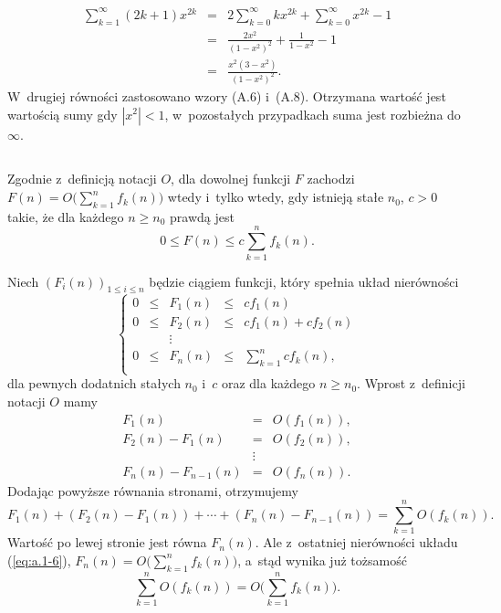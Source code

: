 \subsection{} %
\begin{eqnarray*}
	\sum_{k=1}^\infty(2k+1)x^{2k} &=& 2\sum_{k=0}^\infty kx^{2k}+\sum_{k=0}^\infty x^{2k}-1 \\
	&=& \frac{2x^2}{(1-x^2)^2}+\frac{1}{1-x^2}-1 \\
	&=& \frac{x^2(3-x^2)}{(1-x^2)^2}.
\end{eqnarray*}
W~drugiej równości zastosowano wzory (A.6) i~(A.8). Otrzymana wartość jest wartością sumy gdy $|x^2|<1$, w~pozostałych przypadkach suma jest rozbieżna do $\infty$.

\subsection{} %
Zgodnie z~definicją notacji $O$, dla dowolnej funkcji $F$ zachodzi $F(n) = O\bigl(\sum_{k=1}^nf_k(n)\bigr)$ wtedy i~tylko wtedy, gdy istnieją stałe $n_0$, $c>0$ takie, że dla każdego $n\ge n_0$ prawdą jest
\[
	0\le F(n)\le c\sum_{k=1}^n f_k(n).
\]

Niech $(F_i(n))_{1\le i\le n}$ będzie ciągiem funkcji, który spełnia układ nierówności
\begin{equation}
	\left\{\begin{array}{ccccl}
		0 & \le & F_1(n) &\le& cf_1(n) \\
		0 & \le & F_2(n) &\le& cf_1(n)+cf_2(n) \\
		& & \vdots \\
		0 & \le & F_n(n) &\le& \sum_{k=1}^ncf_k(n), \\
	\end{array}\right. \label{eq:a.1-6}
\end{equation}
dla pewnych dodatnich stałych $n_0$ i~$c$ oraz dla każdego $n\ge n_0$. Wprost z~definicji notacji $O$ mamy
\begin{eqnarray*}
	F_1(n) & = & O(f_1(n)),\\
	F_2(n)-F_1(n) & = & O(f_2(n)),\\
	& \vdots \\
	F_n(n)-F_{n-1}(n) & = & O(f_n(n)).
\end{eqnarray*}
Dodając powyższe równania stronami, otrzymujemy
\[
	F_1(n)+(F_2(n)-F_1(n))+\cdots+(F_n(n)-F_{n-1}(n)) = \sum_{k=1}^nO(f_k(n)).
\]
Wartość po lewej stronie jest równa $F_n(n)$. Ale z~ostatniej nierówności układu (\ref{eq:a.1-6}), $F_n(n) = O\bigl(\sum_{k=1}^nf_k(n)\bigr)$, a~stąd wynika już tożsamość
\[
	\sum_{k=1}^nO(f_k(n)) = O\biggl(\sum_{k=1}^nf_k(n)\biggr).
\]

